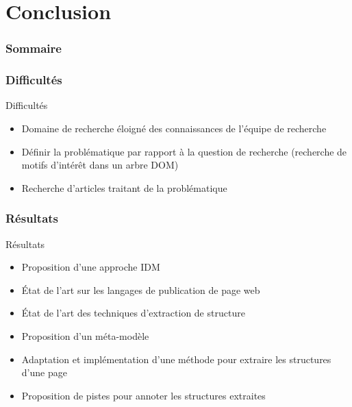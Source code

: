 \documentclass[9pt]{beamer}
\begin{document}
\section{Conclusion}
\begin{frame}
  \frametitle{Sommaire}
\end{frame}
\begin{frame}
	\frametitle{Difficultés}
	\begin{block}{Difficultés}
		\begin{itemize}
			\item Domaine de recherche éloigné des connaissances de l'équipe de recherche
			\item Définir la problématique par rapport à la question de recherche (recherche de motifs d'intérêt dans un arbre DOM)
			\item Recherche d'articles traitant de la problématique
		\end{itemize}
	\end{block}
\end{frame}

\begin{frame}
	\frametitle{Résultats}
	\begin{block}{Résultats}
		\begin{itemize}
			\item Proposition d'une approche IDM  
			\item État de l'art sur les langages de publication de page web
			\item État de l'art des techniques d'extraction de structure
			\item Proposition d'un méta-modèle
			\item Adaptation et implémentation d'une méthode pour extraire les structures d'une page
			\item Proposition de pistes pour annoter les structures extraites  
		\end{itemize}
	\end{block}
\end{frame}
\end{document}

